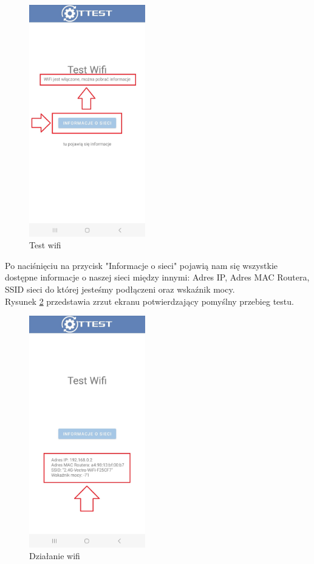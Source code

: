 \begin{figure}[!hbt]
	\begin{center}
		\includegraphics[angle=360, width=0.45\textwidth]{rys/punkt6/wifi2}
		\caption{Test wifi}
		\label{rys:wifi2}
	\end{center}
\end{figure}

\newpage


Po naciśnięciu na przycisk "Informacje o sieci" pojawią nam się wszystkie dostępne informacje o naszej sieci między innymi: Adres IP, Adres MAC Routera, SSID sieci do której jesteśmy podłączeni oraz wskaźnik mocy. \\
Rysunek \ref{rys:wifi3} przedstawia zrzut ekranu potwierdzający pomyślny przebieg testu.

\begin{figure}[!hbt]
	\begin{center}
		\includegraphics[angle=360, width=0.45\textwidth]{rys/punkt6/wifi3}
		\caption{Działanie wifi}
		\label{rys:wifi3}
	\end{center}
\end{figure}

